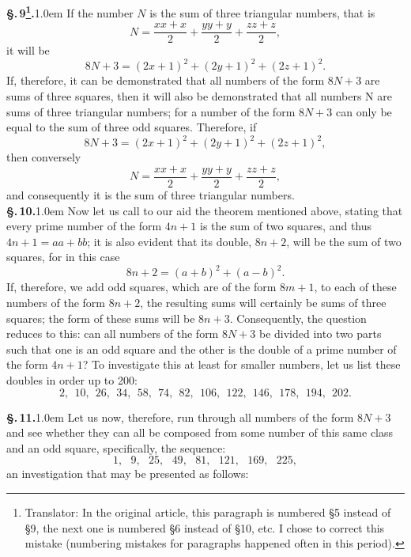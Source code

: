 \documentclass[12pt]{article}
\newcommand{\pnum}[1]{\textbf{\S.\,#1.}\kern1.0em}
\begin{document}
\pnum{9\footnote{Translator: In the original article, this paragraph is numbered §5 instead of §9, the next one is numbered §6 instead of §10, etc. I chose to correct this mistake (numbering mistakes for paragraphs happened often in this period).}} If the number $N$ is the sum of three triangular numbers, that is
$$N = \frac{xx + x}{2} + \frac{yy + y}{2} + \frac{zz + z}{2},$$
it will be
$$8N+3 = (2x+1)^2 + (2y +1 )^2 + (2z+1)^2.$$
If, therefore, it can be demonstrated that all numbers of the form $8N + 3$ are sums of three squares, then it will also be demonstrated that all numbers N are sums of three triangular numbers; for a number of the form $8N + 3$ can only be equal to the sum of three odd squares. Therefore, if
$$8N+3 = (2x+1)^2 + (2y +1 )^2 + (2z+1)^2,$$
then conversely
$$N = \frac{xx + x}{2} + \frac{yy + y}{2} + \frac{zz + z}{2},$$
and consequently it is the sum of three triangular numbers. \\

\pnum{10} Now let us call to our aid the theorem mentioned above, stating that every prime number of the form $4n + 1$ is the sum of two squares, and thus $4n + 1 = aa + bb$; it is also evident that its double, $8n + 2$, will be the sum of two squares, for in this case
$$8n+2 = (a+b)^2 + (a-b)^2.$$
If, therefore, we add odd squares, which are of the form $8m + 1$, to each of these numbers of the form $8n + 2$, the resulting sums will certainly be sums of three squares; the form of these sums will be $8n + 3$. Consequently, the question reduces to this: can all numbers of the form $8N + 3$ be divided into two parts such that one is an odd square and the other is the double of a prime number of the form $4n + 1$? To investigate this at least for smaller numbers, let us list these doubles in order up to 200:
$$2, \ \ 10,\ \ 26,\ \ 34,\ \ 58,\ \ 74,\ \ 82,\ \ 106,\ \ 122,\ \ 146,\ \ 178,\ \ 194,\ \ 202.$$

\pnum{11} Let us now, therefore, run through all numbers of the form $8N+3$ and see whether they can all be composed from some number of this same class and an odd square, specifically, the sequence:
$$1,\ \ \ 9, \ \ \ 25,\ \ \ 49,\ \ \ 81,\ \ \ 121,\ \ \ 169, \ \ \ 225,$$
an investigation that may be presented as follows:\\
\end{document}
